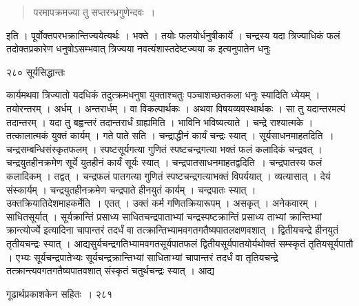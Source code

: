 \documentclass[11pt, openany]{book}
\begin{document}
\begin{quote}
{\qt परमापक्रमज्या तु सप्तरन्ध्रगुणेन्दवः~। }
 \end{quote}

इति । पूर्वोक्तपरभक्रान्तिज्ययेत्यर्थः । भक्ते । तयोः फलयोर्धनुषीकार्ये । चन्द्रस्य यदा त्रिज्याधिकं फलं तदोक्तप्रकारेण धनुषोऽसम्भवात् त्रिज्यया नवत्यंशास्तदेष्टज्यया क इत्यनुपातेन धनुः \textendash
%

\newpage

\noindent २८० \hspace{4cm} सूर्यसिद्धान्तः
\vspace{1cm}


\noindent कार्यमथवा त्रिज्यातो यदधिकं तदुत्क्रमधनुषा युक्ताश्चतुः पञ्चाशच्छतकला धनुः स्यादिति ध्येयम् । तयोरन्तरम् । अर्धम् । अन्तरार्धम् । वा विकल्पार्थकः । अथवा विषयव्यवस्थार्थकः । सा तु यदान्तरमल्पं तदान्तरम् । यदा तु बह्वन्तरं तदान्तरार्धं ग्राह्यमिति । भाविनि भविष्यत्याते । चन्द्रे राश्यात्मके । तत्कालात्मकं युक्तं कार्यम् । गते पाते सति । चन्द्राद्धीनं कार्यं चन्द्रः स्यात् । सूर्यसाधनमाह\textendash तदिति~। चन्द्रसम्बन्धिसंस्कृतफलम् । स्पष्टसूर्यगत्या गुणितं स्पष्टचन्द्रगत्या भक्तं फलं कलादिकं चन्द्रवत् । चन्द्रयुतहीनक्रमेण सूर्ये युतहीनं कार्यं सूर्यः स्यात् । चन्द्रपातसाधनमाह\textendash तद्वदिति~। चन्द्रपातस्य फलं कलादिकम् । तद्वत् । चन्द्रफलं पातगत्या गुणितं स्पष्टचन्द्रगत्याभक्तं विपर्ययात् । व्यत्यासात् । देयं संस्कार्यम् । चन्द्रयुतहीनक्रमेण चन्द्रपाते हीनयुतं कार्यम् । चन्द्रपातः स्यात् । उक्तक्रियातिदेशमाह\textendash कर्मेति~। एतत् । उक्तं कर्म गणितक्रियारूपम् । असकृत् । अनेकवारम् । साधितसूर्यात् । सूर्यक्रान्तिं प्रसाध्य साधितचन्द्रपाताभ्यां चन्द्रस्पष्टक्रान्तिं प्रसाध्य ताभ्यां क्रान्तिभ्यां क्रान्त्योर्ज्ये इत्यादिना चापान्तरं तदर्धं वा तत्क्रान्तिभ्यामवगतगतैष्यपातलक्षणवशात् । द्वितीयचन्द्रे हीनयुतं तृतीयचन्द्रः स्यात् । आद्यसुर्यचन्द्रगतिभ्यामवगतसूर्यपातफलं द्वितीयसूर्यपातयोर्यथोक्तं सम्स्कृतं तृतियसूर्यपातौ । एभ्यः सूर्यचन्द्रपातेभ्यः सूर्यचन्द्रक्रान्तिभ्यां साधिताभ्यां चापान्तरं तदर्धं वा तृतियचन्द्रे तत्क्रान्त्यवगतगतैष्यपातवशात् संस्कृतं चतुर्थचन्द्रः स्यात् । आद्य \textendash


\newpage

\hspace{3cm} गूढार्थप्रकाशकेन सहितः~। \hfill २८१
\vspace{1cm}
\end{document}
